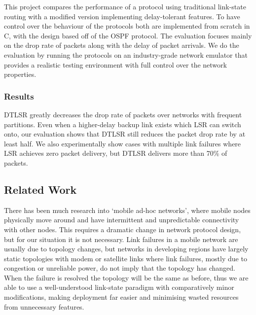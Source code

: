 \documentclass[10pt,twoside,a4paper]{article}
\begin{document}
This project compares the performance of a protocol using traditional link-state routing with a modified version implementing delay-tolerant features. To have control over the behaviour of the protocols both are implemented from scratch in C, with the design based off of the OSPF protocol. The evaluation focuses mainly on the drop rate of packets along with the delay of packet arrivals. We do the evaluation by running the protocols on an industry-grade network emulator that provides a realistic testing environment with full control over the network properties.

\subsubsection{Results}

DTLSR greatly decreases the drop rate of packets over networks with frequent partitions. Even when a higher-delay backup link exists which LSR can switch onto, our evaluation shows that DTLSR still reduces the packet drop rate by at least half. We also experimentally show cases with multiple link failures where LSR achieves zero packet delivery, but DTLSR delivers more than 70\% of packets.

\subsection{Related Work}

There has been much research into `mobile ad-hoc networks', where mobile nodes physically move around and have intermittent and unpredictable connectivity with other nodes. This requires a dramatic change in network protocol design, but for our situation it is not necessary. Link failures in a mobile network are usually due to topology changes, but networks in developing regions have largely static topologies with modem or satellite links where link failures, mostly due to congestion or unreliable power, do not imply that the topology has changed. When the failure is resolved the topology will be the same as before, thus we are able to use a well-understood link-state paradigm with comparatively minor modifications, making deployment far easier and minimising wasted resources from unnecessary features.
\end{document}
